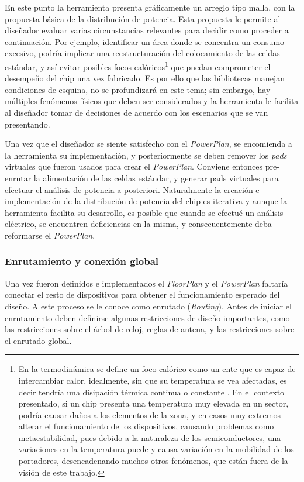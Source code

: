 En este punto la herramienta presenta gráficamente un arreglo tipo malla, con la propuesta básica de la distribución de potencia. Esta propuesta le permite al diseñador evaluar varias circunstancias relevantes para decidir como proceder a continuación. Por ejemplo, identificar un área donde se concentra un consumo excesivo, podría implicar una reestructuración del colocamiento de las celdas estándar, y así evitar posibles {focos calóricos}\footnote{En la termodinámica se define un foco calórico como un ente que es capaz de intercambiar calor, idealmente, sin que su temperatura se vea afectadas, es decir tendría una disipación térmica continua o constante  \cite{villalobos30entropia}. En el contexto presentado, si un chip presenta una temperatura muy elevada en un sector, podría causar daños a los elementos de la zona, y en casos muy extremos alterar el funcionamiento de los dispositivos, causando problemas como metaestabilidad, pues debido a la naturaleza de los semiconductores, una variaciones en la temperatura puede y causa variación en la mobilidad de los portadores, desencadenando muchos otros fenómenos, que están fuera de la visión de este trabajo.} que puedan comprometer el desempeño del chip una vez fabricado. Es por ello que las bibliotecas manejan condiciones de esquina, no se profundizará en este tema; sin embargo, hay múltiples fenómenos físicos que deben ser considerados y la herramienta le facilita al diseñador tomar de decisiones de acuerdo con los escenarios que se van presentando.

Una vez que el diseñador se siente satisfecho con el \textit{PowerPlan}, se encomienda a la herramienta su implementación, y posteriormente se deben remover los \textit{pads} virtuales que fueron usados para crear el \textit{PowerPlan}. Conviene entonces pre-enrutar la alimentación de las celdas estándar, y generar pads virtuales para efectuar el análisis de potencia a posteriori. Naturalmente la creación e implementación de la distribución de potencia del chip es iterativa y aunque la herramienta facilita su desarrollo, es posible que cuando se efectué un análisis eléctrico, se encuentren deficiencias en la misma, y consecuentemente deba reformarse el \textit{PowerPlan}.

\subsubsection{Enrutamiento y conexión global}

Una vez fueron definidos e implementados el \textit{FloorPlan} y el \textit{PowerPlan} faltaría conectar el resto de dispositivos para obtener el funcionamiento esperado del diseño. A este proceso se le conoce como enrutado (\textit{Routing}). Antes de iniciar el enrutamiento deben definirse algunas restricciones de diseño importantes, como las restricciones sobre el árbol de reloj, reglas de antena, y las restricciones sobre el enrutado global.

